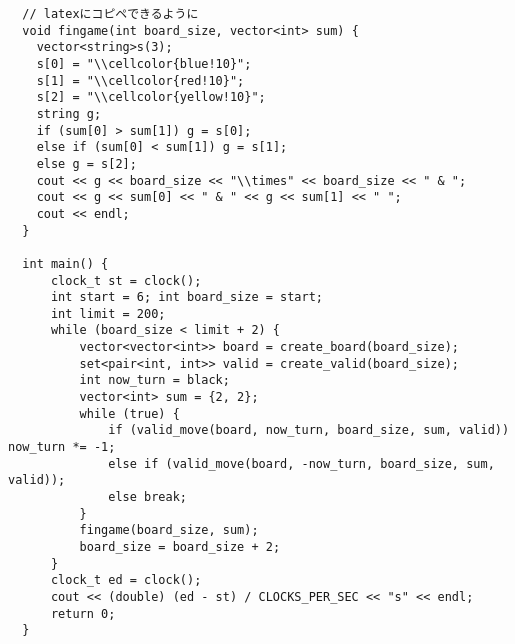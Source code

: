 \documentclass[a4paper,10pt]{ltjsarticle}
\begin{document}
\begin{appendices}
\begin{lstlisting}
  // latexにコピペできるように
  void fingame(int board_size, vector<int> sum) {
    vector<string>s(3);
    s[0] = "\\cellcolor{blue!10}";
    s[1] = "\\cellcolor{red!10}";
    s[2] = "\\cellcolor{yellow!10}";
    string g;
    if (sum[0] > sum[1]) g = s[0];
    else if (sum[0] < sum[1]) g = s[1];
    else g = s[2];
    cout << g << board_size << "\\times" << board_size << " & ";
    cout << g << sum[0] << " & " << g << sum[1] << " ";
    cout << endl;
  }

  int main() {
      clock_t st = clock();
      int start = 6; int board_size = start;
      int limit = 200;
      while (board_size < limit + 2) {
          vector<vector<int>> board = create_board(board_size);
          set<pair<int, int>> valid = create_valid(board_size);
          int now_turn = black;
          vector<int> sum = {2, 2};
          while (true) {
              if (valid_move(board, now_turn, board_size, sum, valid)) now_turn *= -1;
              else if (valid_move(board, -now_turn, board_size, sum, valid));
              else break;
          }
          fingame(board_size, sum);
          board_size = board_size + 2;
      }
      clock_t ed = clock();
      cout << (double) (ed - st) / CLOCKS_PER_SEC << "s" << endl;
      return 0;
  }
\end{lstlisting}

\end{appendices}
\end{document}
